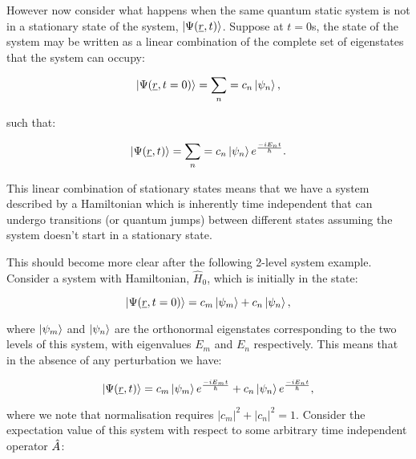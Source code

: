 \noindent However now consider what happens when the same quantum static system is not in a stationary state of the system, $\ket{\Psi(\underline{r}, t)}$. Suppose at $t = 0$s, the state of the system may be written as a linear combination of the complete set of eigenstates that the system can occupy:

\begin{equation}
    \ket{\Psi(\underline{r}, t = 0)} = \sum_n = c_n \ket{\psi_n},
    \label{LinearCombinationStatesNonStationaryNoTimeDependence}
\end{equation}

\noindent such that:

\begin{equation}
    \ket{\Psi(\underline{r}, t)} = \sum_n = c_n \ket{\psi_n} e^\frac{-i E_n t}{\hbar}.
    \label{LinearCombinationStatesNonStationaryTimeDependence}
\end{equation}

\noindent This linear combination of stationary states means that we have a system described by a Hamiltonian which is inherently time independent that can undergo transitions (or quantum jumps) between different states assuming the system doesn't start in a stationary state.

\noindent This should become more clear after the following 2-level system example. Consider a system with Hamiltonian, $\hat{H}_0$, which is initially in the state:

\begin{equation}
    \ket{\Psi(\underline{r}, t = 0)} = c_m \ket{\psi_m} + c_n \ket{\psi_n},
    \label{TwoLevelSystemInitialState}
\end{equation}

\noindent where $\ket{\psi_m}$ and $\ket{\psi_n}$ are the orthonormal eigenstates corresponding to the two levels of this system, with eigenvalues $E_m$ and $E_n$ respectively. This means that in the absence of any perturbation we have:

\begin{equation}
    \ket{\Psi(\underline{r}, t)} = c_m \ket{\psi_m} e^\frac{-i E_m t}{\hbar} + c_n \ket{\psi_n} e^\frac{-i E_n t}{\hbar},
    \label{TwoLevelSystemGeneralState}
\end{equation}

\noindent where we note that normalisation requires $|c_m|^2 + |c_n|^2 = 1$. Consider the expectation value of this system with respect to some arbitrary time independent operator $\Hat{A}$:

